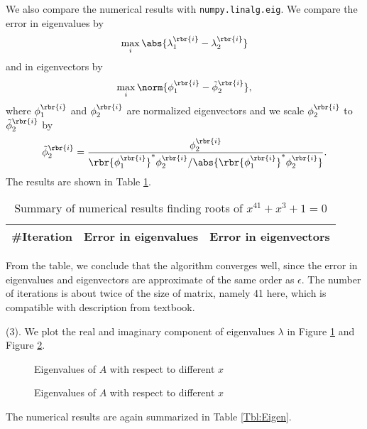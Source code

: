 \documentclass[english, nochinese]{pnote}
\begin{document}
We also compare the numerical results with \verb"numpy.linalg.eig". We compare the error in eigenvalues by
\begin{equation}
\max_i \abs{ \lambda_1^{\rbr{i}} - \lambda_2^{\rbr{i}} }
\end{equation}
and in eigenvectors by
\begin{equation}
\max_i \norm{ \phi_1^{\rbr{i}} - \tilde{\phi}_2^{\rbr{i}} },
\end{equation}
where $\phi_1^{\rbr{i}}$ and $\phi_2^{\rbr{i}}$ are normalized eigenvectors and we scale $\phi_2^{\rbr{i}}$ to $\tilde{\phi}_2^{\rbr{i}}$ by
\begin{equation}
\tilde{\phi}_2^{\rbr{i}} = \frac{ \phi_2^{\rbr{i}} }{ \rbr{\phi_1^{\rbr{i}}}^{\ast} \phi_2^{\rbr{i}} / \abs{ \rbr{\phi_1^{\rbr{i}}}^{\ast} \phi_2^{\rbr{i}} } }.
\end{equation}
The results are shown in Table \ref{Tbl:Root}.

\begin{table}
\centering
\begin{tabular}{|c|c|c|}
\hline
\#Iteration & Error in eigenvalues & Error in eigenvectors \\
\hline

\end{tabular}
\caption{Summary of numerical results finding roots of $ x^{41} + x^3 + 1 = 0 $}
\label{Tbl:Root}
\end{table}

From the table, we conclude that the algorithm converges well, since the error in eigenvalues and eigenvectors are approximate of the same order as $\epsilon$. The number of iterations is about twice of the size of matrix, namely 41 here, which is compatible with description from textbook.

(3). We plot the real and imaginary component of eigenvalues $\lambda$ in Figure \ref{Fig:EigenReal} and Figure \ref{Fig:EigenImag}.

\begin{figure}
\centering

\caption{Eigenvalues of $A$ with respect to different $x$}
\label{Fig:EigenReal}
\end{figure}

\begin{figure}
\centering

\caption{Eigenvalues of $A$ with respect to different $x$}
\label{Fig:EigenImag}
\end{figure}

The numerical results are again summarized in Table \ref{Tbl:Eigen}.
\end{document}
